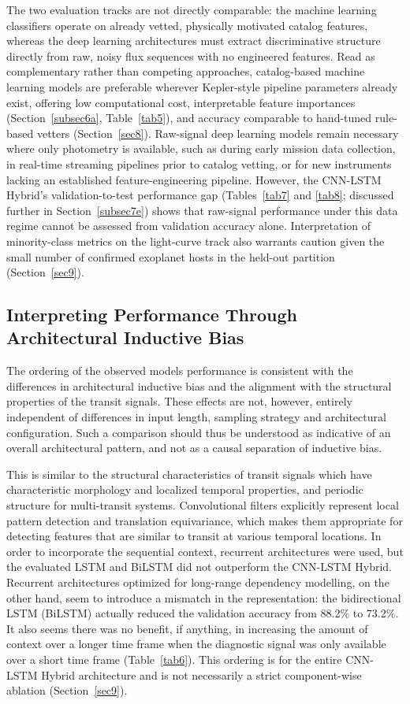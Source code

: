\documentclass[preprint,11pt,times]{elsarticle}
\begin{document}
The two evaluation tracks are not directly comparable: the machine learning classifiers operate on already vetted, physically motivated catalog features, whereas the deep learning architectures must extract discriminative structure directly from raw, noisy flux sequences with no engineered features. Read as complementary rather than competing approaches, catalog-based machine learning models are preferable wherever Kepler-style pipeline parameters already exist, offering low computational cost, interpretable feature importances (Section~\ref{subsec6a}, Table~\ref{tab5}), and accuracy comparable to hand-tuned rule-based vetters (Section~\ref{sec8}). Raw-signal deep learning models remain necessary where only photometry is available, such as during early mission data collection, in real-time streaming pipelines prior to catalog vetting, or for new instruments lacking an established feature-engineering pipeline. However, the CNN-LSTM Hybrid's validation-to-test performance gap (Tables~\ref{tab7} and \ref{tab8}; discussed further in Section~\ref{subsec7e}) shows that raw-signal performance under this data regime cannot be assessed from validation accuracy alone. Interpretation of minority-class metrics on the light-curve track also warrants caution given the small number of confirmed exoplanet hosts in the held-out partition (Section~\ref{sec9}).

\subsection{Interpreting Performance Through Architectural Inductive Bias}\label{subsec7b}

The ordering of the observed models performance is consistent with the differences in architectural inductive bias and the alignment with the structural properties of the transit signals. These effects are not, however, entirely independent of differences in input length, sampling strategy and architectural configuration. Such a comparison should thus be understood as indicative of an overall architectural pattern, and not as a causal separation of inductive bias.

This is similar to the structural characteristics of transit signals which have characteristic morphology and localized temporal properties, and periodic structure for multi-transit systems. Convolutional filters explicitly represent local pattern detection and translation equivariance, which makes them appropriate for detecting features that are similar to transit at various temporal locations. In order to incorporate the sequential context, recurrent architectures were used, but the evaluated LSTM and BiLSTM did not outperform the CNN-LSTM Hybrid. Recurrent architectures optimized for long-range dependency modelling, on the other hand, seem to introduce a mismatch in the representation: the bidirectional LSTM (BiLSTM) actually reduced the validation accuracy from 88.2\% to 73.2\%. It also seems there was no benefit, if anything, in increasing the amount of context over a longer time frame when the diagnostic signal was only available over a short time frame (Table~\ref{tab6}). This ordering is for the entire CNN-LSTM Hybrid architecture and is not necessarily a strict component-wise ablation (Section~\ref{sec9}).
\end{document}
